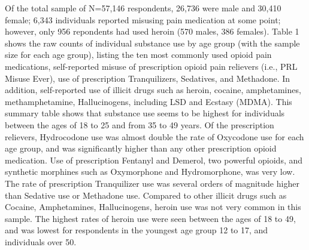\documentclass[sigconf]{acmart}
\begin{document}
Of the total sample of N=57,146 respondents, 26,736 were male and 30,410 
female; 6,343 individuals reported misusing pain medication at some point; 
however, only 956 repondents had used heroin (570 males, 386 females). Table 1 
shows the raw counts of individual substance use by age group (with the sample 
size for each age group), listing the ten most commonly used opioid pain 
medications, self-reported misuse of prescription opioid pain relievers (i.e., 
PRL Misuse Ever), use of prescription Tranquilizers, Sedatives, and Methadone. 
In addition, self-reported use of illicit drugs such as heroin, cocaine, 
amphetamines, methamphetamine, Hallucinogens, including LSD and Ecstasy 
(MDMA). This summary table shows that substance use seems to be highest for 
individuals between the ages of 18 to 25 and from 35 to 49 years. Of the
prescription relievers, Hydrocodone use was almost double the rate of 
Oxycodone use for each age group, and was significantly higher than any other 
prescription opioid medication. Use of prescription Fentanyl and Demerol,
two powerful opioids, and synthetic morphines such as Oxymorphone and
Hydromorphone, was very low. The rate of prescription Tranquilizer use
was several orders of magnitude higher than Sedative use or Methadone use.
Compared to other illicit drugs such as Cocaine, Amphetamines, Hallucinogens,
heroin use was not very common in this sample. The highest rates of heroin
use were seen between the ages of 18 to 49, and was lowest for respondents
in the youngest age group 12 to 17, and individuals over 50. 
\end{document}

